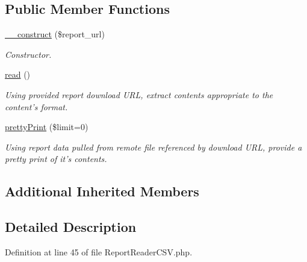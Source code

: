 \subsection*{Public Member Functions}
\begin{DoxyCompactItemize}
\item 
\hyperlink{classTune_1_1Management_1_1Reports_1_1ReportReaderCSV_a2c03ae135945ad6c0a420d6e5df3d227}{\-\_\-\-\_\-construct} (\$report\-\_\-url)
\begin{DoxyCompactList}\small\item\em Constructor. \end{DoxyCompactList}\item 
\hyperlink{classTune_1_1Management_1_1Reports_1_1ReportReaderCSV_adad0aa2d88b5657545134fdf21813af8}{read} ()
\begin{DoxyCompactList}\small\item\em Using provided report download U\-R\-L, extract contents appropriate to the content's format. \end{DoxyCompactList}\item 
\hyperlink{classTune_1_1Management_1_1Reports_1_1ReportReaderCSV_a8f841d3be18e549dbafad31abb889dfa}{pretty\-Print} (\$limit=0)
\begin{DoxyCompactList}\small\item\em Using report data pulled from remote file referenced by download U\-R\-L, provide a pretty print of it's contents. \end{DoxyCompactList}\end{DoxyCompactItemize}
\subsection*{Additional Inherited Members}


\subsection{Detailed Description}


Definition at line 45 of file Report\-Reader\-C\-S\-V.\-php.



